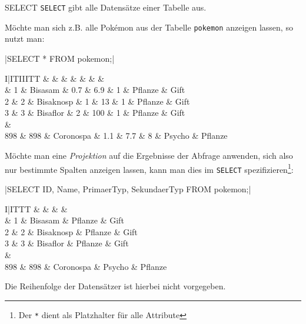 \begin{sql}{SELECT}
    \texttt{SELECT} gibt alle Datensätze einer Tabelle aus.

    Möchte man sich z.B. alle Pokémon aus der Tabelle \texttt{pokemon} anzeigen lassen, so nutzt man:

    |SELECT * FROM pokemon;|

    \begin{tabular}{I|ITIIITT}
        &  &  &  &  &  &  &  \\ & 1 & Bisasam & 0.7 & 6.9 & 1 & Pflanze & Gift \\
        2 & 2 & Bisaknosp & 1 & 13 & 1 & Pflanze & Gift \\
        3 & 3 & Bisaflor & 2 & 100 & 1 & Pflanze & Gift \\
         &  \\
        898 & 898 & Coronospa & 1.1 & 7.7 & 8 & Psycho & Pflanze \\
    \end{tabular}

    Möchte man eine \emph{Projektion} auf die Ergebnisse der Abfrage anwenden, sich also nur bestimmte Spalten anzeigen lassen, kann man dies im \texttt{SELECT} spezifizieren\footnote{Der \texttt{*} dient als Platzhalter für alle Attribute}:

    |SELECT ID, Name, PrimaerTyp, SekundaerTyp FROM pokemon;|

    \begin{tabular}{I|ITTT}
        &  &  &  &  \\ & 1 & Bisasam & Pflanze & Gift \\
        2 & 2 & Bisaknosp & Pflanze & Gift \\
        3 & 3 & Bisaflor & Pflanze & Gift \\
         &  \\
        898 & 898 & Coronospa & Psycho & Pflanze \\
    \end{tabular}

    Die Reihenfolge der Datensätzer ist hierbei nicht vorgegeben.
\end{sql}

